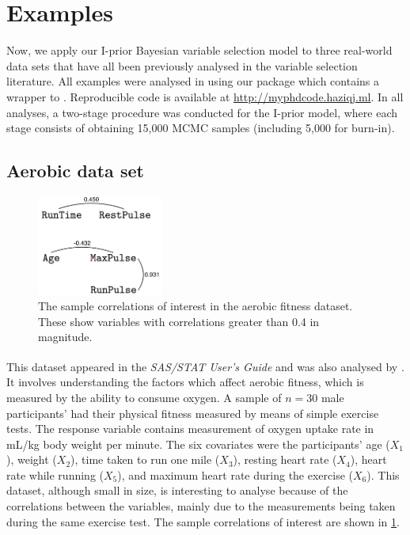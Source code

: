 \documentclass[showframe,11pt,twoside,openright]{report}
\begin{document}

\section{Examples}

Now, we apply our I-prior Bayesian variable selection model to three real-world data sets that have all been previously analysed in the variable selection literature.
All examples were analysed in  using our  package \citep{jamil2018ripriorBVS} which contains a wrapper to  \citep{plummer2003jags}.
Reproducible code is available at \url{http://myphdcode.haziqj.ml}.
In all analyses, a two-stage procedure was conducted for the I-prior model, where each stage consists of obtaining 15,000 MCMC samples (including 5,000 for burn-in).

\subsection{Aerobic data set}

\begin{figure}[htb]
	\centering
	\includegraphics[height=1.3in]{figure/aerobic-cor}
	\caption[The sample correlations of interest in the aerobic fitness dataset]{The sample correlations of interest in the aerobic fitness dataset. These show variables with correlations greater than 0.4 in magnitude. \label{fig:aerobic-cor}}
\end{figure}

This dataset appeared in the \textit{SAS/STAT\textsuperscript{\textregistered} User's Guide} \citep{SAS2008} and was also analysed by \citet{Kuo1998}. 
It involves understanding the factors which affect aerobic fitness, which is measured by the ability to consume oxygen. 
A sample of $n=30$ male participants' had their physical fitness measured by means of simple exercise tests. 
The response variable contains measurement of oxygen uptake rate in mL/kg body weight per minute. 
The six covariates were the participants' age ($X_1$), weight ($X_2$), time taken to run one mile ($X_3$), resting heart rate ($X_4$), heart rate while running ($X_5$), and maximum heart rate during the exercise ($X_6$). 
This dataset, although small in size, is interesting to analyse because of the correlations between the variables, mainly due to the measurements being taken during the same exercise test. 
The sample correlations of interest are shown in \cref{fig:aerobic-cor}.
\end{document}
